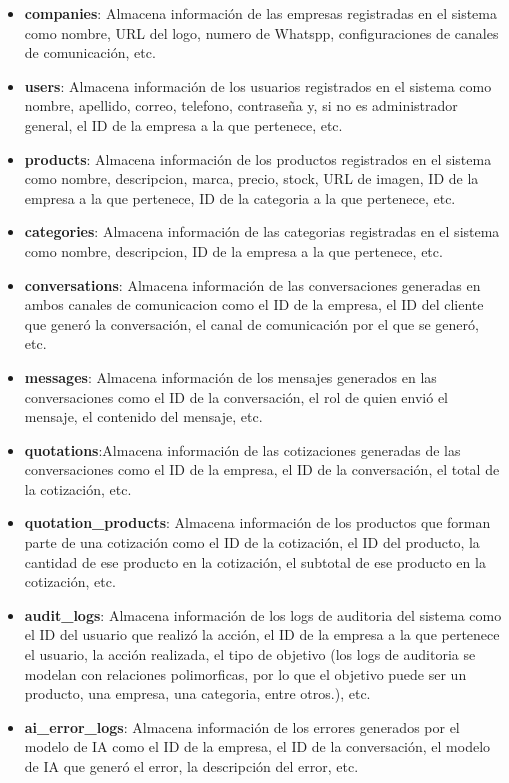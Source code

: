 \begin{itemize}
    \item \textbf{companies}: Almacena información de las empresas registradas en el sistema como nombre, URL del logo, numero de Whatspp, configuraciones de canales de comunicación, etc.
    \item \textbf{users}: Almacena información de los usuarios registrados en el sistema como nombre, apellido, correo, telefono, contraseña y, si no es administrador general, el ID de la empresa a la que pertenece, etc.
    \item \textbf{products}: Almacena información de los productos registrados en el sistema como nombre, descripcion, marca, precio, stock, URL de imagen, ID de la empresa a la que pertenece, ID de la categoria a la que pertenece, etc.
    \item \textbf{categories}: Almacena información de las categorias registradas en el sistema como nombre, descripcion, ID de la empresa a la que pertenece, etc.
    \item \textbf{conversations}: Almacena información de las conversaciones generadas en ambos canales de comunicacion como el ID de la empresa, el ID del cliente que generó la conversación, el canal de comunicación por el que se generó, etc. 
    \item \textbf{messages}: Almacena información de los mensajes generados en las conversaciones como el ID de la conversación, el rol de quien envió el mensaje, el contenido del mensaje, etc.
    \item \textbf{quotations}:Almacena información de las cotizaciones generadas de las conversaciones como el ID de la empresa, el ID de la conversación, el total de la cotización, etc.
    \item \textbf{quotation\_products}: Almacena información de los productos que forman parte de una cotización como el ID de la cotización, el ID del producto, la cantidad de ese producto en la cotización, el subtotal de ese producto en la cotización, etc.
    \item \textbf{audit\_logs}: Almacena información de los logs de auditoria del sistema como el ID del usuario que realizó la acción, el ID de la empresa a la que pertenece el usuario, la acción realizada, el tipo de objetivo (los logs de auditoria se modelan con relaciones polimorficas, por lo que el objetivo puede ser un producto, una empresa, una categoria, entre otros.), etc.
    \item \textbf{ai\_error\_logs}: Almacena información de los errores generados por el modelo de IA como el ID de la empresa, el ID de la conversación, el modelo de IA que generó el error, la descripción del error, etc.

\end{itemize}
